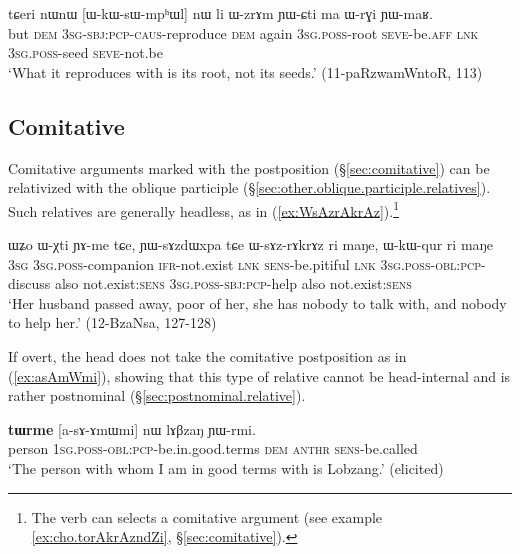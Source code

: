 \begin{exe}
\ex \label{ex:WkWsWmphWl}
\gll tɕeri nɯnɯ [ɯ-kɯ-sɯ-mpʰɯl] nɯ li ɯ-zrɤm ɲɯ-ɕti ma ɯ-rɣi ɲɯ-maʁ.  \\
but \textsc{dem} \textsc{3sg}-\textsc{sbj}:\textsc{pcp}-\textsc{caus}-reproduce \textsc{dem} again \textsc{3sg}.\textsc{poss}-root \textsc{seve}-be.\textsc{aff} \textsc{lnk} \textsc{3sg}.\textsc{poss}-seed \textsc{seve}-not.be \\
\glt `What it reproduces with is its root, not its seeds.' (11-paRzwamWntoR, 113)
\end{exe}
 
\subsection{Comitative} \label{sec:comitative.relativization}
Comitative arguments marked with the postposition  (§\ref{sec:comitative}) can be relativized with the oblique participle (§\ref{sec:other.oblique.participle.relatives}). Such relatives are generally headless, as in (\ref{ex:WsAzrAkrAz}).\footnote{The verb  can selects a comitative argument (see example \ref{ex:cho.torAkrAzndZi}, §\ref{sec:comitative}). }

\begin{exe}
\ex \label{ex:WsAzrAkrAz}
\gll ɯʑo ɯ-χti ɲɤ-me tɕe, ɲɯ-sɤzdɯxpa tɕe ɯ-sɤz-rɤkrɤz ri maŋe, ɯ-kɯ-qur ri maŋe \\
 \textsc{3sg} \textsc{3sg}.\textsc{poss}-companion \textsc{ifr}-not.exist \textsc{lnk} \textsc{sens}-be.pitiful \textsc{lnk} \textsc{3sg}.\textsc{poss}-\textsc{obl}:\textsc{pcp}-discuss also not.exist:\textsc{sens} \textsc{3sg}.\textsc{poss}-\textsc{sbj}:\textsc{pcp}-help also not.exist:\textsc{sens} \\
\glt `Her husband passed away, poor of her, she has nobody to talk with, and nobody to help her.' (12-BzaNsa, 127-128)
\end{exe}

If overt, the head does not take the comitative postposition  as in (\ref{ex:asAmWmi}), showing that this type of relative cannot be head-internal and is rather postnominal (§\ref{sec:postnominal.relative}).

\begin{exe}
\ex \label{ex:asAmWmi}
\gll \textbf{tɯrme} [a-sɤ-ɤmɯmi] nɯ lɤβzaŋ ɲɯ-rmi. \\
person \textsc{1sg}.\textsc{poss}-\textsc{obl}:\textsc{pcp}-be.in.good.terms \textsc{dem}  \textsc{anthr} \textsc{sens}-be.called \\
\glt `The person with whom I am in good terms with is Lobzang.' (elicited)
\end{exe}


